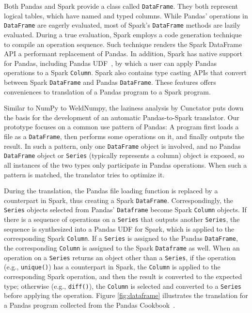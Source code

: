 \documentclass[sigconf]{acmart}\settopmatter{printfolios=true,printccs=false,printacmref=false}\setcopyright{none}
\begin{document}
Both Pandas and Spark provide a class called \texttt{DataFrame}. They both represent logical tables, which have named and typed columns. While Pandas' operations in \texttt{DataFrame} are eagerly evaluated, most of Spark's \texttt{DataFrame} methods are lazily evaluated. During a true evaluation, Spark employs a code generation technique~\cite{Neumann:2011} to compile an operation sequence. Such technique renders the Spark DataFrame API a performant replacement of Pandas. In addition, Spark has native support for Pandas, including Pandas UDF~\cite{PandasUDF}, by which a user can apply Pandas operations to a Spark \texttt{Column}. Spark also contains type casting APIs that convert between Spark \texttt{DataFrame} and Pandas \texttt{DataFrame}. These features offers conveniences to translation of a Pandas program to a Spark program.

Similar to NumPy to WeldNumpy, the laziness analysis by Cunctator puts down the basis for the development of an automatic Pandas-to-Spark translator. Our prototype focuses on a common use pattern of Pandas: A program first loads a file as a \texttt{DataFrame}, then performs some operations on it, and finally outputs the result. In such a pattern, only one \texttt{DataFrame} object is involved, and no Pandas \texttt{DataFrame} object or \texttt{Series} (typically represents a column) object is exposed, so all instances of the two types only participate in Pandas operations. When such a pattern is matched, the translator tries to optimize it. 

During the translation, the Pandas file loading function is replaced by a counterpart in Spark, thus creating a Spark \texttt{DataFrame}. Correspondingly, the \texttt{Series} objects selected from Pandas' \texttt{Dataframe} become Spark \texttt{Column} objects. If there is a sequence of operations on a \texttt{Series} that outputs another \texttt{Series}, the sequence is synthesized into a Pandas UDF for Spark, which is applied to the corresponding Spark \texttt{Column}. If a \texttt{Series} is assigned to the Pandas \texttt{DataFrame}, the corresponding \texttt{Column} is assigned to the Spark \texttt{Dataframe} as well. When an operation on a \texttt{Series} returns an object other than a \texttt{Series}, if the operation (e.g., \texttt{unique()}) has a counterpart in Spark, the \texttt{Column} is applied to the corresponding Spark operation, and then the result is converted to the expected type; otherwise (e.g., \texttt{diff()}), the \texttt{Column} is selected and converted to a \texttt{Series} before applying the operation. Figure \ref{fig:dataframe} illustrates the translation for a Pandas program collected from the Pandas Cookbook~\cite{Pandascookbook}.
\end{document}
